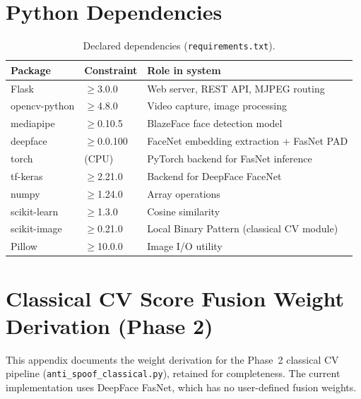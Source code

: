 \documentclass[11pt,a4paper]{article}
\begin{document}
\section{Python Dependencies}
\label{app:deps}

\begin{table}[H]
\centering
\caption{Declared dependencies (\texttt{requirements.txt}).}
\renewcommand{\arraystretch}{1.2}
\begin{tabular}{@{}lll@{}}
\toprule
\textbf{Package} & \textbf{Constraint} & \textbf{Role in system} \\
\midrule
Flask          & $\geq$3.0.0  & Web server, REST API, MJPEG routing \\
opencv-python  & $\geq$4.8.0  & Video capture, image processing \\
mediapipe      & $\geq$0.10.5 & BlazeFace face detection model \\
deepface       & $\geq$0.0.100 & FaceNet embedding extraction + FasNet PAD \\
torch          & (CPU)        & PyTorch backend for FasNet inference \\
tf-keras       & $\geq$2.21.0 & Backend for DeepFace FaceNet \\
numpy          & $\geq$1.24.0 & Array operations \\
scikit-learn   & $\geq$1.3.0  & Cosine similarity \\
scikit-image   & $\geq$0.21.0 & Local Binary Pattern (classical CV module) \\
Pillow         & $\geq$10.0.0 & Image I/O utility \\
\bottomrule
\end{tabular}
\end{table}

\section{Classical CV Score Fusion Weight Derivation (Phase 2)}
\label{app:weights}

This appendix documents the weight derivation for the Phase~2 classical CV
pipeline (\texttt{anti\_spoof\_classical.py}), retained for completeness.
The current implementation uses DeepFace FasNet, which has no user-defined
fusion weights.
\end{document}
